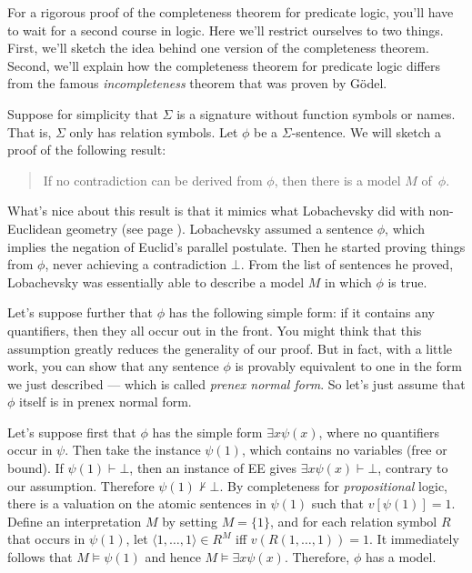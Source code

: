 For a rigorous proof of the completeness theorem for predicate logic,
you'll have to wait for a second course in logic.  Here we'll restrict
ourselves to two things.  First, we'll sketch the idea behind one
version of the completeness theorem.  Second, we'll explain how the
completeness theorem for predicate logic differs from the famous {\it
  incompleteness} theorem that was proven by G{\"o}del.

Suppose for simplicity that $\Sigma$ is a signature without function
symbols or names.  That is, $\Sigma$ only has relation symbols.  Let
$\phi$ be a $\Sigma$-sentence.  We will sketch a proof of the
following result:
\begin{quote} If no contradiction can be derived from $\phi$, then
  there is a model $M$ of~$\phi$. \end{quote} What's nice about this
result is that it mimics what Lobachevsky did with non-Euclidean
geometry (see page \pageref{loba}).  Lobachevsky assumed a sentence
$\phi$, which implies the negation of Euclid's parallel postulate.
Then he started proving things from $\phi$, never achieving a
contradiction $\bot$.  From the list of sentences he proved,
Lobachevsky was essentially able to describe a model $M$ in which
$\phi$ is true.

Let's suppose further that $\phi$ has the following simple form: if it
contains any quantifiers, then they all occur out in the front.  You
might think that this assumption greatly reduces the generality of our
proof.  But in fact, with a little work, you can show that any
sentence $\phi$ is provably equivalent to one in the form we just
described --- which is called \emph{prenex normal form}.  So let's
just assume that $\phi$ itself is in prenex normal form.

Let's suppose first that $\phi$ has the simple form
$\exists x\psi (x)$, where no quantifiers occur in $\psi$.  Then take
the instance $\psi (1)$, which contains no variables (free or bound).
If $\psi (1)\vdash\bot$, then an instance of EE gives
$\exists x\psi (x)\vdash\bot$, contrary to our assumption.  Therefore
$\psi (1)\not\vdash\bot$.  By completeness for {\it propositional}
logic, there is a valuation on the atomic sentences in $\psi (1)$ such
that $v[\psi (1)]=1$.  Define an interpretation $M$ by setting
$M=\{ 1\}$, and for each relation symbol $R$ that occurs in
$\psi (1)$, let $\langle 1,\dots ,1\rangle \in R^M$ iff
$v(R(1,\dots ,1))=1$.  It immediately follows that $M\vDash\psi (1)$
and hence $M\vDash\exists x\psi (x)$.  Therefore, $\phi$ has a model.

